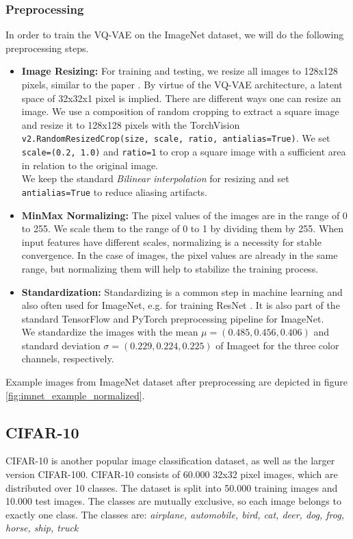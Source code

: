 \documentclass[10pt,a4paper,twoside]{article}
\begin{document}
    \subsubsection{Preprocessing}
    In order to train the VQ-VAE on the ImageNet dataset, we will do the following preprocessing steps.

    \begin{itemize}
        \item \textbf{Image Resizing:} For training and testing, we resize all images to 128x128 pixels, similar to the paper \cite{vqvae}. By virtue of the VQ-VAE architecture, a latent space of 32x32x1 pixel is implied.
        There are different ways one can resize an image. We use a composition of random cropping to extract a square image and resize it to 128x128 pixels with the TorchVision \texttt{v2.RandomResizedCrop(size, scale, ratio, antialias=True)}. We set \texttt{scale=(0.2, 1.0)} and \texttt{ratio=1} to crop a square image with a sufficient area in relation to the original image.\\
        We keep the standard \textit{Bilinear interpolation} for resizing and set \texttt{antialias=True} to reduce aliasing artifacts.

        \item \textbf{MinMax Normalizing:} The pixel values of the images are in the range of 0 to 255. We scale them to the range of 0 to 1 by dividing them by 255. When input features have different scales, normalizing is a necessity for stable convergence. In the case of images, the pixel values are already in the same range, but normalizing them will help to stabilize the training process.

        \item \textbf{Standardization:} Standardizing is a common step in machine learning and also often used for ImageNet, e.g. for training ResNet \cite{resnet}. It is also part of the standard TensorFlow and PyTorch preprocessing pipeline for ImageNet. \\
        We standardize the images with the mean $\mu = (0.485, 0.456, 0.406)$ and standard deviation $\sigma = (0.229, 0.224, 0.225)$ of Imageet for the three color channels, respectively.
    
    \end{itemize}

    Example images from ImageNet dataset after preprocessing are depicted in figure \ref{fig:imnet_example_normalized}.

    \subsection{CIFAR-10}
    CIFAR-10 \cite{cifar10} is another popular image classification dataset, as well as the larger version CIFAR-100. CIFAR-10 consists of 60.000 32x32 pixel images, which are distributed over 10 classes. The dataset is split into 50.000 training images and 10.000 test images. The classes are mutually exclusive, so each image belongs to exactly one class. The classes are: \textit{airplane, automobile, bird, cat, deer, dog, frog, horse, ship, truck}
\end{document}
